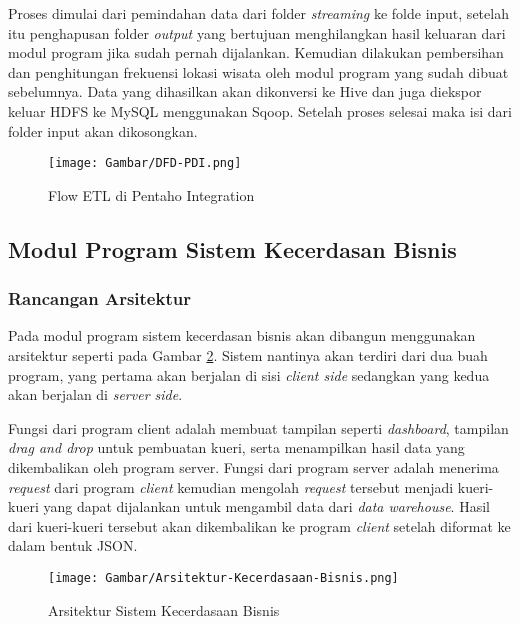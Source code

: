 Proses dimulai dari pemindahan data dari folder \textit{streaming} ke folde input, setelah itu penghapusan folder \textit{output} yang bertujuan menghilangkan hasil keluaran dari modul program jika sudah pernah dijalankan. Kemudian dilakukan pembersihan dan penghitungan frekuensi lokasi wisata oleh modul program yang sudah dibuat sebelumnya. Data yang dihasilkan akan dikonversi ke Hive dan juga diekspor keluar HDFS ke MySQL menggunakan Sqoop. Setelah proses selesai maka isi dari folder input akan dikosongkan.

\begin{figure}[H]
	\centering
	\texttt{[image: Gambar/DFD-PDI.png]}
	\caption[Flow ETL di Pentaho Integration]{Flow ETL di Pentaho Integration} 
	\label{fig:dfd_pdi}
\end{figure}

\subsection{Modul Program Sistem Kecerdasan Bisnis}
\subsubsection{Rancangan Arsitektur}
Pada modul program sistem kecerdasan bisnis akan dibangun menggunakan arsitektur seperti pada Gambar \ref{fig:bi_arsitektur}. Sistem nantinya akan terdiri dari dua buah program, yang pertama akan berjalan di sisi \textit{client side} sedangkan yang kedua akan berjalan di \textit{server side}. 

Fungsi dari program client adalah membuat tampilan seperti \textit{dashboard}, tampilan \textit{drag and drop} untuk pembuatan kueri, serta menampilkan hasil data yang dikembalikan oleh program server. Fungsi dari program server adalah menerima \textit{request} dari program \textit{client} kemudian mengolah \textit{request} tersebut menjadi kueri-kueri yang dapat dijalankan untuk mengambil data dari \textit{data warehouse}. Hasil dari kueri-kueri tersebut akan dikembalikan ke program \textit{client} setelah diformat ke dalam bentuk JSON.

\begin{figure}[H]
	\centering
	\texttt{[image: Gambar/Arsitektur-Kecerdasaan-Bisnis.png]}
	\caption[Arsitektur Sistem Kecerdasaan Bisnis]{Arsitektur Sistem Kecerdasaan Bisnis} 
	\label{fig:bi_arsitektur}
\end{figure}

